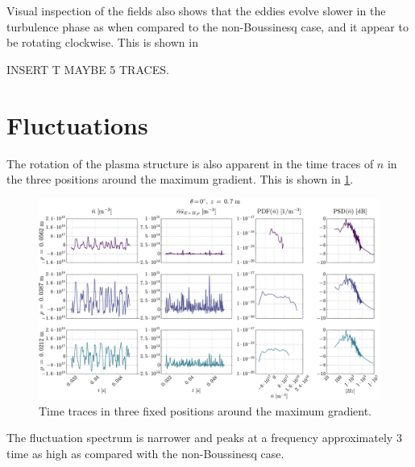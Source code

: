 Visual inspection of the fields also shows that the eddies evolve slower in the turbulence phase as when compared to the non-Boussinesq case, and it appear to be rotating clockwise.
This is shown in

INSERT T MAYBE 5 TRACES.

\section{Fluctuations}
%
The rotation of the plasma structure is also apparent in the time traces of $n$ in the three positions around the maximum gradient.
This is shown in \cref{fig:comb008B}.
%
\begin{figure}[htb]
    \centering
    \includegraphics[width=1.0\textwidth]{fig/results/compareBouss/comb008B}
    \caption{Time traces in three fixed positions around the maximum gradient.}
    \label{fig:comb008B}
\end{figure}
%
The fluctuation spectrum is narrower and peaks at a frequency approximately $3$ time as high as compared with the non-Boussinesq case.

